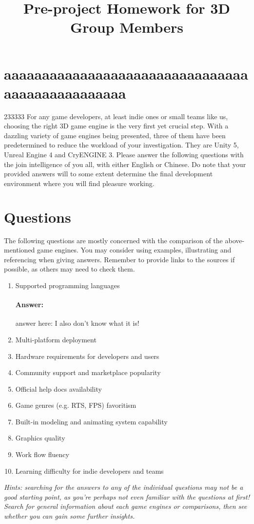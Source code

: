 \documentclass{ctexart}
\title{Pre-project Homework for 3D Group Members}
\begin{document}
	\maketitle
	\section{aaaaaaaaaaaaaaaaaaaaaaaaaaaaaaaaaaaaaaaaaaaaaaaa}
	233333
	For any game developers, at least indie ones or small teams like us, choosing the right 3D game engine is the very first yet crucial step. With a dazzling variety of game engines being presented, three of them have been predetermined to reduce the workload of your investigation. They are Unity 5, Unreal Engine 4 and CryENGINE 3. Please answer the following questions with the join intelligence of you all, with either English or Chinese. Do note that your provided answers will to some extent determine the final development environment where you will find pleasure working.
	\section{Questions}
	The following questions are mostly concerned with the comparison of the above-mentioned game engines. You may consider using examples, illustrating and referencing when giving answers. Remember to provide links to the sources if possible, as others may need to check them.
	\begin{enumerate}
		\item Supported programming languages
		\paragraph{Answer:}
		answer here:
		I also don't know what it is!
		\item Multi-platform deployment
		\item Hardware requirements for developers and users
		\item Community support and marketplace popularity
		\item Official help docs availability
		\item Game genres (e.g. RTS, FPS) favoritism
		\item Built-in modeling and animating system capability
		\item Graphics quality
		\item Work flow fluency
		\item Learning difficulty for indie developers and teams
	\end{enumerate}
	\textit{Hints: searching for the answers to any of the individual questions may not be a good starting point, as you're perhaps not even familiar with the questions at first! Search for general information about each game engines or comparisons, then see whether you can gain some further insights.}
\end{document}
